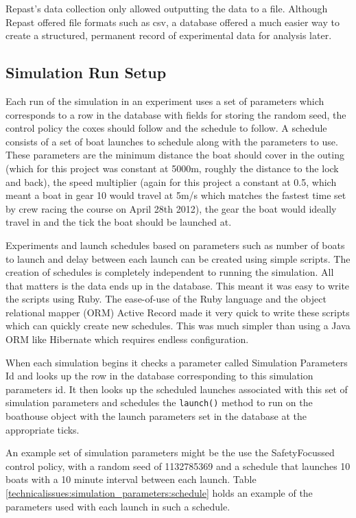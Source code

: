   Repast's data collection only allowed outputting the data to a file. Although Repast offered file formats such as csv, a database offered a much easier way to create a structured, permanent record of experimental data for analysis later.
  
  \subsection{Simulation Run Setup}
  Each run of the simulation in an experiment uses a set of parameters which corresponds to a row in the database with fields for storing the random seed, the control policy the coxes should follow and the schedule to follow. A schedule consists of a set of boat launches to schedule along with the parameters to use. These parameters are the minimum distance the boat should cover in the outing (which for this project was constant at 5000m, roughly the distance to the lock and back), the speed multiplier (again for this project a constant at 0.5, which meant a boat in gear 10 would travel at 5m/s which matches the fastest time set by crew racing the course on April 28th 2012), the gear the boat would ideally travel in and the tick the boat should be launched at.
  
  Experiments and launch schedules based on parameters such as number of boats to launch and delay between each launch can be created using simple scripts. The creation of schedules is completely independent to running the simulation. All that matters is the data ends up in the database. This meant it was easy to write the scripts using Ruby. The ease-of-use of the Ruby language and the object relational mapper (ORM) Active Record made it very quick to write these scripts which can quickly create new schedules. This was much simpler than using a Java ORM like Hibernate which requires endless configuration.
  
  When each simulation begins it checks a parameter called Simulation Parameters Id and looks up the row in the database corresponding to this simulation parameters id. It then looks up the scheduled launches associated with this set of simulation parameters and schedules the \texttt{launch()} method to run on the boathouse object with the launch parameters set in the database at the appropriate ticks.
  
    An example set of simulation parameters might be the use the SafetyFocussed control policy, with a random seed of 1132785369 and a schedule that launches 10 boats with a 10 minute interval between each launch. Table \ref{technicalissues:simulation_parameters:schedule} holds an example of the parameters used with each launch in such a schedule.
    
